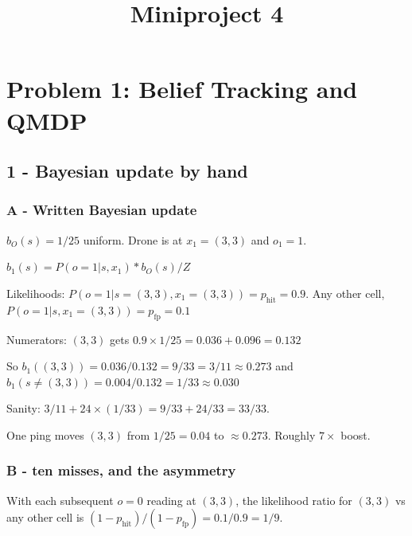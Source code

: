 \documentclass[conference]{IEEEtran}
\begin{document}
	
	
	\title{Miniproject 4}
	
	\author{
	}
	
	\maketitle
	
	
	
	\section{Problem 1: Belief Tracking and QMDP}
	
	
	\subsection{1 - Bayesian update by hand}
	
	\subsubsection{A - Written Bayesian update}
	
	
	$b_O(s) = 1/25$ uniform. Drone is at $x_1=(3,3)$ and $o_1=1$.
	
	$b_1(s)=P(o=1|s,x_1)*b_O(s)/Z$
	
	Likelihoods: $P(o=1|s=(3,3), x_1=(3,3))=p_{\text{hit}}=0.9$. 
	Any other cell, $P(o=1|s,x_1=(3,3)) = p_{\text{fp}}=0.1$
	
	Numerators: $(3,3)$ gets $0.9 \times 1/25 = 0.036 + 0.096 = 0.132$
	
	So $b_1((3,3)) = 0.036/0.132 = 9/33 = 3/11 \approx 0.273$ and $b_1(s \neq (3,3)) = 0.004/0.132 = 1/33 \approx 0.030$
	
	Sanity: $3/11 + 24 \times (1/33) = 9/33 + 24/33 = 33/33$.
	
	
	 One ping moves $(3,3)$ from $1/25 = 0.04$ to $\approx 0.273$. Roughly $7\times$ boost.
	
	\subsubsection{B - ten misses, and the asymmetry}
	With each subsequent $o=0$ reading at $(3,3)$, the likelihood ratio for $(3,3)$ vs any other cell is $(1-p_{\text{hit}})/(1-p_{\text{fp}}) = 0.1/0.9 = 1/9$.
	
\end{document}
